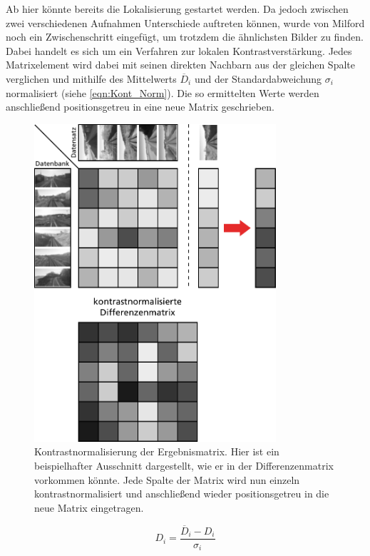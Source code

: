 \documentclass[12pt,a4paper,titlepage]{scrartcl}
\begin{document}
Ab hier könnte bereits die Lokalisierung gestartet werden. Da jedoch zwischen zwei verschiedenen Aufnahmen Unterschiede auftreten können, wurde von Milford noch ein Zwischenschritt eingefügt, um trotzdem die ähnlichsten Bilder zu finden. Dabei handelt es sich um ein Verfahren zur lokalen Kontrastverstärkung. Jedes Matrixelement wird dabei mit seinen direkten Nachbarn aus der gleichen Spalte verglichen und mithilfe des Mittelwerts $\overline{D}_i$ und der Standardabweichung $\sigma_i$ normalisiert (siehe \autoref{eqn:Kont_Norm}). Die so ermittelten Werte werden anschließend positionsgetreu in eine neue Matrix geschrieben. 

\begin{figure}[h!]
	\centering
	\includegraphics[width=0.8\textwidth]{../Bilder/Kontrastnormalisierung.pdf}
	\caption[Darstellung der Kontrastnormalisierung]{Kontrastnormalisierung der Ergebnismatrix. Hier ist ein beispielhafter Ausschnitt dargestellt, wie er in der Differenzenmatrix vorkommen könnte. Jede Spalte der Matrix wird nun einzeln kontrastnormalisiert und anschließend wieder positionsgetreu in die neue Matrix eingetragen.}
	\label{img:Kon_Norm}
\end{figure}

\begin{equation}
D_i=\frac{\overline{D}_i - D_i}{\sigma_i}
\label{eqn:Kont_Norm}
\end{equation}
\end{document}
